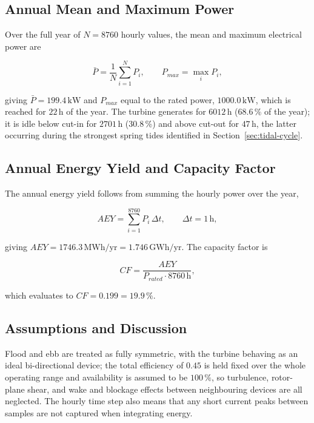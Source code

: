 \subsection{Annual Mean and Maximum Power}
\label{sec:stream-annual-power}
Over the full year of $N=8760$ hourly values, the mean and maximum electrical power are

\begin{equation}
    \bar{P} = \frac{1}{N}\sum_{i=1}^{N} P_i, \qquad P_{max} = \max_i P_i,
    \label{eq:stream-meanmax}
\end{equation}

giving $\bar{P}=199.4\,\mathrm{kW}$ and $P_{max}$ equal to the rated power, $1000.0\,\mathrm{kW}$, which is reached for $22\,\mathrm{h}$ of the year. The turbine generates for $6012\,\mathrm{h}$ (68.6\,\% of the year); it is idle below cut-in for $2701\,\mathrm{h}$ (30.8\,\%) and above cut-out for $47\,\mathrm{h}$, the latter occurring during the strongest spring tides identified in Section~\ref{sec:tidal-cycle}.

\subsection{Annual Energy Yield and Capacity Factor}
\label{sec:stream-aey-cf}
The annual energy yield follows from summing the hourly power over the year,

\begin{equation}
    AEY = \sum_{i=1}^{8760} P_i\,\Delta t, \qquad \Delta t = 1\,\mathrm{h},
    \label{eq:stream-aey}
\end{equation}

giving $AEY = 1746.3\,\mathrm{MWh/yr} = 1.746\,\mathrm{GWh/yr}$. The capacity factor is

\begin{equation}
    CF = \frac{AEY}{P_{rated}\cdot 8760\,\mathrm{h}},
    \label{eq:stream-cf}
\end{equation}

which evaluates to $CF = 0.199 = 19.9\,\%$.

\subsection{Assumptions and Discussion}
\label{sec:stream-discussion}
Flood and ebb are treated as fully symmetric, with the turbine behaving as an ideal bi-directional device; the total efficiency of $0.45$ is held fixed over the whole operating range and availability is assumed to be $100\,\%$, so turbulence, rotor-plane shear, and wake and blockage effects between neighbouring devices are all neglected. The hourly time step also means that any short current peaks between samples are not captured when integrating energy.

